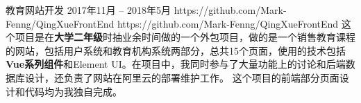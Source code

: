 \documentclass[10pt]{article} %
\begin{document}
\begin{paracol}{2}
\projectentry
{教育网站开发}
{2017年11月 -- 2018年5月}
{https://github.com/Mark-Fenng/QingXueFrontEnd}
{\small {https://github.com/Mark-Fenng/QingXueFrontEnd}}
{这个项目是在\textbf{大学二年级}时抽业余时间做的一个外包项目，做的是一个销售教育课程的网站，包括用户系统和教育机构系统两部分，总共15个页面，使用的技术包括\textbf{Vue系列组件}和Element UI。在项目中，我同时参与了大量功能上的讨论和后端数据库设计，还负责了网站在阿里云的部署维护工作。} %
{这个项目的前端部分页面设计和代码均为我独自完成。} %




\end{paracol}

\end{document}
